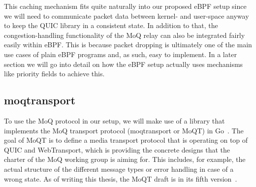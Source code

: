 This caching mechanism fits quite naturally into our proposed eBPF setup since we will need to 
communicate packet data between kernel- and user-space anyway to keep the QUIC library in a 
consistent state.
In addition to that, the congestion-handling functionality of the MoQ relay can also
be integrated fairly easily within eBPF\@.
This is because packet dropping is ultimately one of the main use cases of plain eBPF 
programs and, as such, easy to implement.
In a later section we will go into detail on how the eBPF setup actually uses mechanisms like 
priority fields to achieve this.

\subsection{moqtransport}
To use the MoQ protocol in our setup, we will make use of a library that implements 
the MoQ transport protocol (moqtransport or MoQT) in Go~\parencite{priority-moqtransport-repo}.
The goal of MoQT is to define a media transport protocol that is operating on top
of QUIC and WebTransport, which is providing the concrete designs that the charter of 
the MoQ working group is aiming for.
This includes, for example, the actual structure of the different message types or error handling in case 
of a wrong state.
As of writing this thesis, the MoQT draft is in its fifth version~\parencite{draft-moqtransport}.

